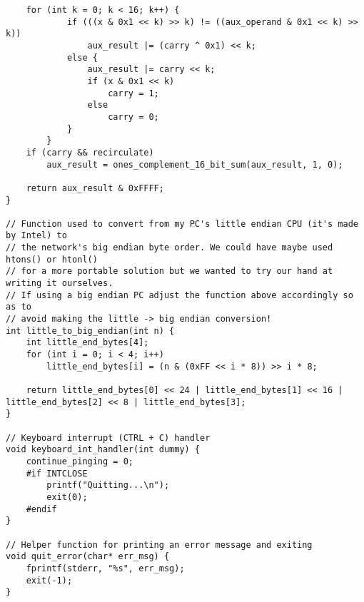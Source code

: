 \documentclass[landscape]{article}
\begin{document}
\begin{verbatim}
    for (int k = 0; k < 16; k++) {
            if (((x & 0x1 << k) >> k) != ((aux_operand & 0x1 << k) >> k))
                aux_result |= (carry ^ 0x1) << k;
            else {
                aux_result |= carry << k;
                if (x & 0x1 << k)
                    carry = 1;
                else
                    carry = 0;
            }
        }
    if (carry && recirculate)
        aux_result = ones_complement_16_bit_sum(aux_result, 1, 0);

    return aux_result & 0xFFFF;
}

// Function used to convert from my PC's little endian CPU (it's made by Intel) to
// the network's big endian byte order. We could have maybe used htons() or htonl()
// for a more portable solution but we wanted to try our hand at writing it ourselves.
// If using a big endian PC adjust the function above accordingly so as to
// avoid making the little -> big endian conversion!
int little_to_big_endian(int n) {
    int little_end_bytes[4];
    for (int i = 0; i < 4; i++)
        little_end_bytes[i] = (n & (0xFF << i * 8)) >> i * 8;

    return little_end_bytes[0] << 24 | little_end_bytes[1] << 16 | little_end_bytes[2] << 8 | little_end_bytes[3];
}

// Keyboard interrupt (CTRL + C) handler
void keyboard_int_handler(int dummy) {
    continue_pinging = 0;
    #if INTCLOSE
        printf("Quitting...\n");
        exit(0);
    #endif
}

// Helper function for printing an error message and exiting
void quit_error(char* err_msg) {
    fprintf(stderr, "%s", err_msg);
    exit(-1);
}
            \end{verbatim}
\end{document}
